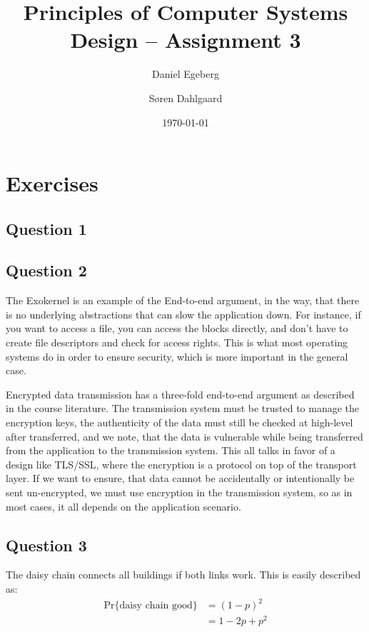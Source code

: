\documentclass[a4paper,final]{article}
\title{Principles of Computer Systems Design -- Assignment 3}
\date{\today}
\author{Daniel Egeberg \and Søren Dahlgaard}
\begin{document}
\maketitle

\section{Exercises}

\subsection*{Question 1}

\subsection*{Question 2}

The Exokernel is an example of the End-to-end argument, in the way, that
there is no underlying abstractions that can slow the application down.
For instance, if you want to access a file, you can access the blocks directly,
and don't have to create file descriptors and check for access rights. This
is what most operating systems do in order to ensure security, which is more
important in the general case.

Encrypted data transmission has a three-fold end-to-end argument as
described in the course literature. The transmission system must be trusted
to manage the encryption keys, the authenticity of the data must still be
checked at high-level after transferred, and we note, that the data is
vulnerable while being transferred from the application to the transmission
system. This all talks in favor of a design like TLS/SSL, where the encryption
is a protocol on top of the transport layer. If we want to ensure, that data
cannot be accidentally or intentionally be sent un-encrypted, we must use
encryption in the transmission system, so as in most cases, it all depends
on the application scenario.

\subsection*{Question 3}

The daisy chain connects all buildings if both links work. This is easily
described as:
\begin{align*}
    \text{Pr}\{\text{daisy chain good}\} &= (1-p)^2 \\
                                         &= 1 - 2p + p^2
\end{align*}
\end{document}
